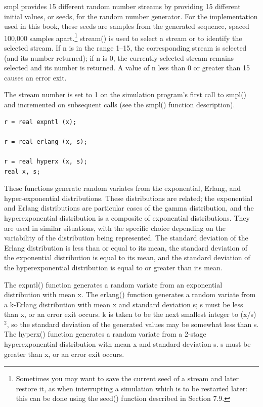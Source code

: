 smpl provides 15 different random number streams by providing 15 different
initial values, or seeds, for the random number generator. For the
implementation used in this book, these seeds are samples from the
\noindent generated sequence, spaced 100,000 samples apart.\footnote{Sometimes you may want to
save the current seed of a stream and later restore it, as when interrupting a
simulation which is to be restarted later: this can be done using the seed()
function described in Section 7.9.} stream() is used to select a stream or to
identify the selected stream. If n is in the range 1--15, the corresponding
stream is selected (and its number returned); if n is 0, the currently-selected
stream remains selected and its number is returned. A value of n less than 0
or greater than 15 causes an error exit.

The stream number is set to 1 on the simulation program's first call to
smpl() and incremented on subsequent calls (see the smpl() function
description).

\begin{verbatim}
r = real expntl (x);

r = real erlang (x, s);

r = real hyperx (x, s);
real x, s;
\end{verbatim}

These functions generate random variates from the exponential, Erlang, and
hyper-exponential distributions. These distributions are related; the
exponential and Erlang distributions are particular cases of the gamma
distribution, and the hyperexponential distribution is a composite of
exponential distributions. They are used in similar situations, with the
specific choice depending on the variability of the distribution being
represented. The standard deviation of the Erlang distribution is less than or
equal to its mean, the standard deviation of the exponential distribution is
equal to its mean, and the standard deviation of the hyperexponential
distribution is equal to or greater than its mean.

The expntl() function generates a random variate from an exponential
distribution with mean x. The erlang() function generates a random variate
from a k-Erlang distribution with mean x and standard deviation s; s must be
less than x, or an error exit occurs. k is taken to be the next smallest
integer to (x/s)$^2$, so the standard deviation of the generated values may be
somewhat less than s. The hyperx() function generates a random variate from a
2-stage hyperexponential distribution with mean x and standard deviation s. s
must be greater than x, or an error exit occurs.

